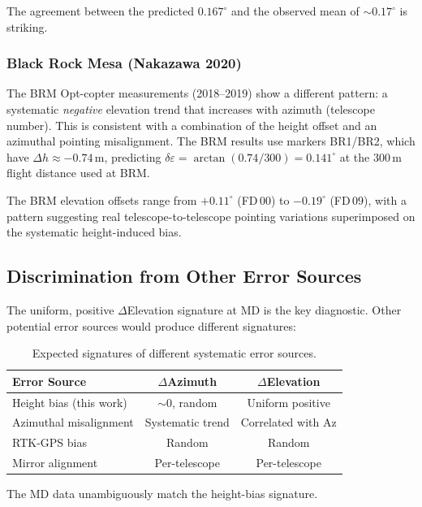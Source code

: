 \documentclass[11pt,letterpaper]{article}
\newcommand{\degree}{^\circ}
\begin{document}
The agreement between the predicted $0.167\degree$ and the observed mean of ${\sim}0.17\degree$ is striking.

\subsubsection{Black Rock Mesa (Nakazawa 2020)}

The BRM Opt-copter measurements (2018--2019) show a different pattern: a systematic \emph{negative} elevation trend that increases with azimuth (telescope number). This is consistent with a combination of the height offset and an azimuthal pointing misalignment. The BRM results use markers BR1/BR2, which have $\Delta h \approx -0.74$\,m, predicting $\delta\varepsilon = \arctan(0.74/300) = 0.141\degree$ at the 300\,m flight distance used at BRM.

The BRM elevation offsets range from $+0.11\degree$ (FD\,00) to $-0.19\degree$ (FD\,09), with a pattern suggesting real telescope-to-telescope pointing variations superimposed on the systematic height-induced bias.

\subsection{Discrimination from Other Error Sources}

The uniform, positive $\Delta$Elevation signature at MD is the key diagnostic. Other potential error sources would produce different signatures:

\begin{table}[H]
\centering
\caption{Expected signatures of different systematic error sources.}
\label{tab:signatures}
\smallskip
\begin{tabular}{@{}lcc@{}}
\toprule
Error Source & $\Delta$Azimuth & $\Delta$Elevation \\
\midrule
Height bias (this work)     & $\sim\!0$, random & Uniform positive \\
Azimuthal misalignment      & Systematic trend  & Correlated with Az \\
RTK-GPS bias                & Random            & Random \\
Mirror alignment            & Per-telescope     & Per-telescope \\
\bottomrule
\end{tabular}
\end{table}

\noindent The MD data unambiguously match the height-bias signature.
\end{document}
